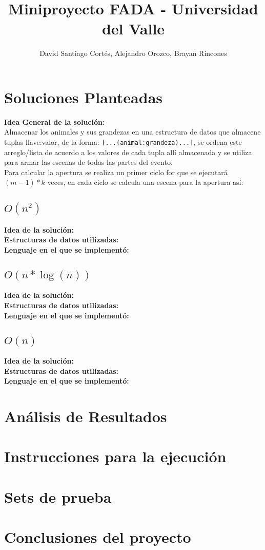 \documentclass{article}
\title{Miniproyecto FADA - Universidad del Valle}
\date{}
\author{David Santiago Cortés, Alejandro Orozco, Brayan Rincones}
\begin{document}
	\maketitle

	\section{Soluciones Planteadas}
		\textbf{Idea General de la solución:}\\
		Almacenar los animales y sus grandezas en una estructura de datos que almacene tuplas llave:valor, de la forma:
		\texttt{[...(animal:grandeza)...]}, se ordena este arreglo/lista de acuerdo a los valores de cada tupla allí
		almacenada y se utiliza para armar las escenas de todas las partes del evento.\\
		
		Para calcular la apertura se realiza un primer ciclo for que se ejecutará $(m-1)*k$ veces, en cada ciclo se calcula
		una escena para la apertura así:
		
		\subsection{$O(n^2)$}
			\textbf{Idea de la solución:}\\
			\textbf{Estructuras de datos utilizadas:} \\
			\textbf{Lenguaje en el que se implementó:}
		
		\subsection{$O(n*\log(n))$}
			\textbf{Idea de la solución:}\\
			\textbf{Estructuras de datos utilizadas:} \\
			\textbf{Lenguaje en el que se implementó:}
		\subsection{$O(n)$}
			\textbf{Idea de la solución:}\\	
			\textbf{Estructuras de datos utilizadas:} \\
			\textbf{Lenguaje en el que se implementó:}
	\section{Análisis de Resultados}

	\section{Instrucciones para la ejecución}

	\section{Sets de prueba}

	\section{Conclusiones del proyecto}
\end{document}
